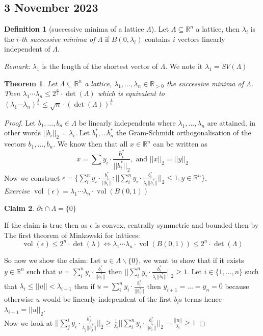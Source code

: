 \documentclass[a4paper,11pt,american]{article}
\newcommand{\R}{\mathbb{R}}
\DeclareMathOperator{\vol}{vol}
\theoremstyle{plain}
\newtheorem{theorem}{Theorem}
\newtheorem{claim}[theorem]{Claim}
\theoremstyle{definition}
\newtheorem{definition}{Definition}
\begin{document}
\subsection*{3 November 2023}

\begin{definition}[successive minima of a lattice $\Lambda$]
    Let $\Lambda\subseteq \R^n$ a lattice, then $\lambda_i$ is the \emph{$i$-th successive minima of $\Lambda
    $} if $B(0,\lambda_i)$ contains $i$ vectors linearly independent of $\Lambda$.
\end{definition}
\emph{Remark:} $\lambda_1$ is the length of the shortest vector of $\Lambda$. We note it $\lambda_1=SV(\Lambda)$
\begin{theorem}
    Let $\Lambda\subseteq \R^n$ a lattice, $\lambda_1,\dots,\lambda_n\in\R_{>0}$ the successive minima of $\Lambda$. Then $\lambda_1\cdots\lambda_n\leq 2^\frac{n}{2}\cdot\det(\Lambda)$ which is equivalent to  $(\lambda_1\cdots\lambda_n)^{\frac{1}{n}}\leq \sqrt{n}\cdot(\det(\Lambda))^{\frac{1}{n}}$
\end{theorem}
\begin{proof}
    Let $b_1,\dots,b_n\in\Lambda$ be linearly independents where $\lambda_1,\dots,\lambda_n$ are attained, in other words $\vert\vert b_i\vert\vert_2=\lambda_i$.
    Let $b_1^*,\dots b_n^*$ the Gram-Schmidt orthogonalisation of the vectors $b_1,\dots,b_n$. We know then that all $x\in\R^n$ can be written as $$x=\sum y_i\cdot \frac{b_i^*}{\vert\vert b_i^*\vert\vert_2},\; \text{and } \vert\vert x\vert\vert_2=\vert\vert y\vert\vert_2$$
    Now we construct $\epsilon=\{\sum_i^n y_i\cdot \frac{b_i^*}{\vert\vert b_i^*\vert\vert}:\vert\vert\sum_i^n y_i\cdot \frac{b_i^*}{\lambda_i\vert\vert b_i^*\vert\vert}\vert\vert_2\leq 1, y\in\R^n\}$.\\
    \emph{Exercise} $\vol(\epsilon)=\lambda_1\cdots\lambda_n\cdot\vol(B(0,1))$
    \begin{claim}
        $\partial\epsilon\cap\Lambda=\{0\}$
    \end{claim}
    If the claim is true then as $\epsilon$ is convex, centrally symmetric and bounded then by The first theorem of Minkowski for lattices: $$\vol(\epsilon)\leq 2^n\cdot\det(\lambda)\iff \lambda_1\cdots\lambda_n\cdot\vol(B(0,1))\leq 2^n\cdot\det(\Lambda)$$

    So now we show the claim: Let $u\in\Lambda\backslash\{0\}$, we want to show that if it exists $y\in\R^n$ such that $u=\sum_i^n y_i\cdot \frac{b_i^*}{\vert\vert b_i^*\vert\vert}$ then $\vert\vert\sum_i^n y_i\cdot \frac{b_i^*}{\lambda_i\vert\vert b_i^*\vert\vert}\vert\vert_2\geq 1$.
    Let $i\in\{1,\dots,n\}$ such that $\lambda_i\leq \vert\vert u\vert\vert<\lambda_{i+1}$ then if $u=\sum_i^n y_i\cdot \frac{b_i^*}{\vert\vert b_i^*\vert\vert}$ then $y_{i+1}=\dots=y_n=0$ because otherwise $u$ would be linearly independent of the first $b_i$s terms hence $\lambda_{i+1}=\vert\vert u\vert\vert_2$.\\
    Now we look at $\vert\vert\sum_j^i y_i\cdot \frac{b_j^*}{\lambda_j\vert\vert b_j^*\vert\vert}\vert\vert_2\geq\frac{1}{\lambda_i}\vert\vert\sum_i^n y_i\cdot \frac{b_i^*}{\vert\vert b_i^*\vert\vert}\vert\vert_2=\frac{\vert\vert u\vert\vert}{\lambda_i}\geq 1$
    \end{proof}
\end{document}
